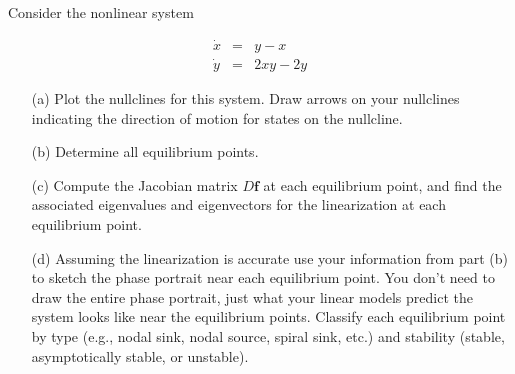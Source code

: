 \documentclass[11pt,letterpaper,boxed]{pset}
\begin{document}

    \begin{problem} [Exercise 1. ]
        Consider the nonlinear  system
        
        \begin{eqnarray*}
            \dot{x} & =& y-x \\
            \dot{y} &=& 2xy-2y 
        \end{eqnarray*}
        
        \begin{itemize}
            \item[(a)] Plot the nullclines for this system. Draw arrows on your nullclines indicating the direction of motion for states on the nullcline. 
            \item[(b)] Determine all equilibrium points. 
            \item[(c)] Compute the Jacobian matrix $D\mathbf{f}$ at each equilibrium point, and find the associated eigenvalues and eigenvectors for the linearization at each equilibrium point. 
            \item[(d)]  Assuming the linearization is accurate use your information from part (b) to sketch the phase portrait near each equilibrium point. You don't need to draw the entire phase portrait, just what your linear models predict the system looks like near the equilibrium points.   Classify each equilibrium point by type (e.g., nodal sink, nodal source, spiral sink, etc.) and stability (stable, asymptotically stable, or unstable).
        \end{itemize}
    \end{problem}
    \newpage
    
\end{document}
